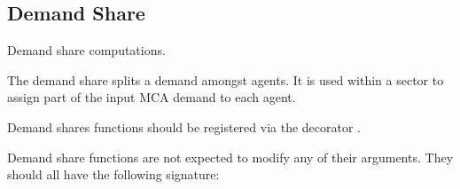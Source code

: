 \documentclass[letterpaper,10pt,english]{sphinxmanual}
\begin{document}
\subsection{Demand Share}
\label{\detokenize{api:module-muse.demand_share}}\label{\detokenize{api:demand-share}}
Demand share computations.

The demand share splits a demand amongst agents. It is used within a sector to assign
part of the input MCA demand to each agent.

Demand shares functions should be registered via the decorator .

Demand share functions are not expected to modify any of their arguments. They
should all have the following signature:
\end{document}
